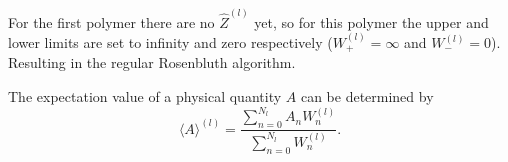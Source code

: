 For the first polymer there are no $\hat{Z}^{(l)}$ yet, so for this polymer the upper and lower limits are set to infinity and zero respectively ($ W_+^{(l)}= \infty$ and $W_-^{(l)}=0$). Resulting in the regular Rosenbluth algorithm.

The expectation value of a physical quantity $A$ can be determined by 
\begin{equation}
    \langle A \rangle^{(l)} = \frac{\sum_{n=0}^{N_l}A_nW_n^{(l)}}{\sum_{n=0}^{N_l}W_n^{(l)}}.
\end{equation}
